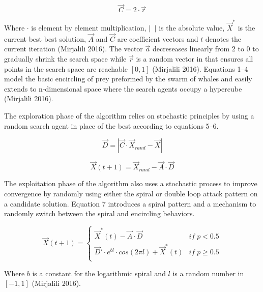 \documentclass[11pt]{article}
\begin{document}
\begin{equation}
	\vec{C} = 2\cdot\vec{r}
\end{equation}

Where $\cdot$ is element by element multiplication, $| \;\; |$ is the absolute value, $\vec{X}^*$ is the current best best solution, $\vec{A}$ and $\vec{C}$ are coefficient vectors and $t$ denotes the current iteration (Mirjalili 2016).
The vector $\vec{a}$ decreseases linearly from $2$ to $0$ to gradually shrink the search space while $\vec{r}$ is a random vector in that ensures all points in the search space are reachable $[0,1]$ (Mirjalili 2016).
Equations 1--4 model the basic encircling of prey preformed by the swarm of whales and easily extends to n-dimensional space where the search agents occupy a hypercube (Mirjalili 2016).

The exploration phase of the algorithm relies on stochastic principles by using a random search agent in place of the best according to equations 5--6.

\begin{equation}
	\vec{D} = |\vec{C}\cdot\vec{X}_{rand} - \vec{X}|
\end{equation}

\begin{equation}
	\vec{X}(t+1) = \vec{X}_{rand} - \vec{A}\cdot\vec{D}
\end{equation}

The exploitation phase of the algorithm also uses a stochastic process to improve convergence by randomly using either the spiral or double loop attack pattern on a candidate solution.
Equation 7 introduces a spiral pattern and a mechanism to randomly switch between the spiral and encircling behaviors.

\begin{equation}
	\vec{X}(t+1) =
	\begin{cases}
		\vec{X}^*(t) - \vec{A}\cdot\vec{D} &if \; p < 0.5\\
		\vec{D}'\cdot e^{bl} \cdot cos(2\pi l) + \vec{X}^*(t) &if \; p \geq 0.5\\
	\end{cases}
\end{equation}

Where $b$ is a constant for the logarithmic spiral and $l$ is a random number in $[-1, 1]$ (Mirjalili 2016).
\end{document}

